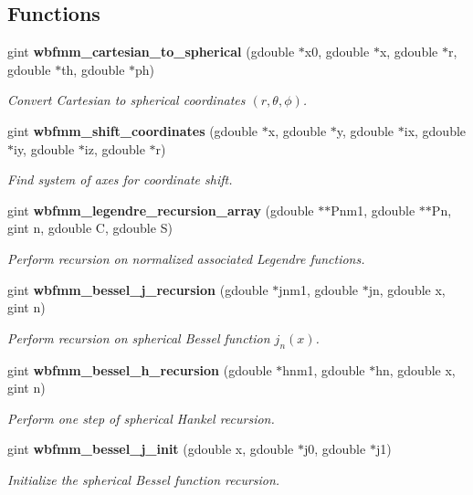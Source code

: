 \subsection*{Functions}
\begin{DoxyCompactItemize}
\item 
gint {\bf wbfmm\+\_\+cartesian\+\_\+to\+\_\+spherical} (gdouble $\ast$x0, gdouble $\ast$x, gdouble $\ast$r, gdouble $\ast$th, gdouble $\ast$ph)
\begin{DoxyCompactList}\small\item\em Convert Cartesian to spherical coordinates $(r,\theta,\phi)$. \end{DoxyCompactList}\item 
gint {\bf wbfmm\+\_\+shift\+\_\+coordinates} (gdouble $\ast$x, gdouble $\ast$y, gdouble $\ast$ix, gdouble $\ast$iy, gdouble $\ast$iz, gdouble $\ast$r)
\begin{DoxyCompactList}\small\item\em Find system of axes for coordinate shift. \end{DoxyCompactList}\item 
gint {\bf wbfmm\+\_\+legendre\+\_\+recursion\+\_\+array} (gdouble $\ast$$\ast$Pnm1, gdouble $\ast$$\ast$Pn, gint n, gdouble C, gdouble S)
\begin{DoxyCompactList}\small\item\em Perform recursion on normalized associated Legendre functions. \end{DoxyCompactList}\item 
gint {\bf wbfmm\+\_\+bessel\+\_\+j\+\_\+recursion} (gdouble $\ast$jnm1, gdouble $\ast$jn, gdouble x, gint n)
\begin{DoxyCompactList}\small\item\em Perform recursion on spherical Bessel function $j_{n}(x)$. \end{DoxyCompactList}\item 
gint {\bf wbfmm\+\_\+bessel\+\_\+h\+\_\+recursion} (gdouble $\ast$hnm1, gdouble $\ast$hn, gdouble x, gint n)
\begin{DoxyCompactList}\small\item\em Perform one step of spherical Hankel recursion. \end{DoxyCompactList}\item 
gint {\bf wbfmm\+\_\+bessel\+\_\+j\+\_\+init} (gdouble x, gdouble $\ast$j0, gdouble $\ast$j1)
\begin{DoxyCompactList}\small\item\em Initialize the spherical Bessel function recursion. \end{DoxyCompactList}\item 

\end{DoxyCompactItemize}

